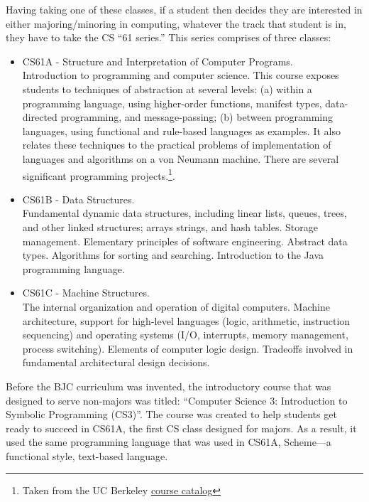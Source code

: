 \documentclass[oneside,titlepage,numbers=noenddot,headinclude,%
               footinclude=true,cleardoublepage=empty,abstractoff,BCOR=2mm,%
               paper=a4,fontsize=11pt,ngerman,american]{scrreprt}
\numberwithin{theorem}{chapter}
\numberwithin{definition}{chapter}
\numberwithin{algorithm}{chapter}
\numberwithin{figure}{chapter}
\numberwithin{table}{chapter}
\numberwithin{equation}{chapter}
\begin{document}
Having taking one of these classes, if a student then decides they are interested in either majoring/minoring in computing, whatever the track that student is in, they have to take the CS ``61 series.'' This series comprises of three classes:
\begin{itemize}
\item CS61A - Structure and Interpretation of Computer Programs.\\Introduction to programming and computer science. This course exposes students to techniques of abstraction at several levels: (a) within a programming language, using higher-order functions, manifest types, data-directed programming, and message-passing; (b) between programming languages, using functional and rule-based languages as examples. It also relates these techniques to the practical problems of implementation of languages and algorithms on a von Neumann machine. There are several significant programming projects.\footnote{Taken from the UC Berkeley \href{http://guide.berkeley.edu/courses/compsci/}{course catalog}}.
\item CS61B - Data Structures.\\Fundamental dynamic data structures, including linear lists, queues, trees, and other linked structures; arrays strings, and hash tables. Storage management. Elementary principles of software engineering. Abstract data types. Algorithms for sorting and searching. Introduction to the Java programming language. 
\item CS61C - Machine Structures.\\The internal organization and operation of digital computers. Machine architecture, support for high-level languages (logic, arithmetic, instruction sequencing) and operating systems (I/O, interrupts, memory management, process switching). Elements of computer logic design. Tradeoffs involved in fundamental architectural design decisions. 

\end{itemize}
Before the BJC curriculum was invented, the introductory course that was designed to serve non-majors was titled: ``Computer Science 3: Introduction to Symbolic Programming (CS3)''. The course was created to help students get ready to succeed in CS61A, the first CS class designed for majors. As a result, it used the same programming language that was used in CS61A, Scheme---a functional style, text-based language.
\end{document}
